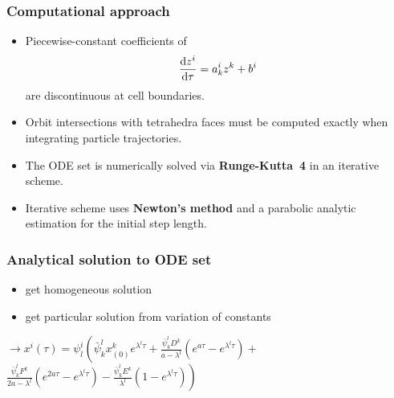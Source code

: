 \documentclass{beamer}
\newcommand{\rd}{{\rm d}}
\begin{document}
\begin{frame}
\frametitle{Computational approach}
\vspace{-0.5cm}
\begin{itemize}
	\item Piecewise-constant coefficients of 
	$$
	\frac{\rd z^i}{\rd \tau} = a^i_k z^k + b^i
	$$
	are discontinuous at cell boundaries. 
	\item Orbit intersections with tetrahedra faces must be computed exactly when integrating particle trajectories.
	
	\item The ODE set is numerically solved via \textbf{Runge-Kutta~4} in an iterative scheme.
	\item Iterative scheme uses \textbf{Newton's method} and a parabolic analytic estimation for the  initial step length.

\end{itemize}
\end{frame}

\begin{frame}
\frametitle{Analytical solution to ODE set}
\vspace{-1cm}
\begin{itemize}
	\item get homogeneous solution \newline
	\item get particular solution from variation of constants\newline
\end{itemize}

$\rightarrow x^i(\tau) =   \psi^i_l  \left(\bar{\psi}^l_k x^k_{(0)}e^{\lambda^l \tau} + \frac{\bar{\psi}^l_k D^k}{a-\lambda^l}(e^{a\tau}-e^{\lambda^l\tau}) + \right.$\\
\vspace{0.5cm}
\hspace{1.5cm}$\left. \frac{\bar{\psi}^l_k F^k}{2a-\lambda^l}(e^{2a\tau}-e^{\lambda^l\tau})-\frac{\bar{\psi}^l_k E^k}{\lambda^l}(1-e^{\lambda^l\tau}) \right)$
\end{frame}
\end{document}
